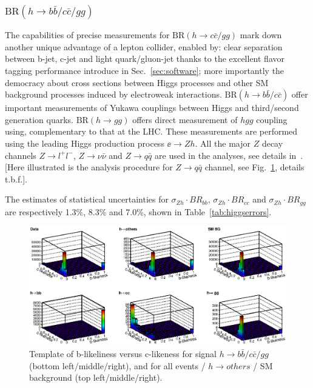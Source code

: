 \subsubsection{$\mathrm{BR}(h\to b\bar{b}/c\bar{c}/gg)$}
The capabilities of precise measurements for $\mathrm{BR}(h\to c\bar{c}/gg)$ 
mark down another unique advantage of a lepton collider, enabled by:
clear separation between b-jet, c-jet and light quark/gluon-jet thanks to the
excellent flavor tagging performance introduce in Sec.~\ref{sec:software};
more importantly the democracy about cross sections between Higgs processes and
other SM background processes induced by electroweak interactions.
$\mathrm{BR}(h\to b\bar{b}/c\bar{c})$ offer important measurements of 
Yukawa couplings between Higgs and third/second generation quarks. 
$\mathrm{BR}(h\to gg)$ offers direct measurement of $hgg$ coupling 
using, complementary to that at the LHC. These measurements are performed
using the leading Higgs production process $\ee\to Zh$. All the major $Z$ decay
channels $Z\to l^+l^-$, $Z\to\nu\bar{\nu}$ and $Z\to q\bar{q}$ are used in the analyses,
see details in~\cite{Ono:2013sea}. [Here illustrated is the analysis procedure 
for $Z\to q\bar{q}$ channel, see Fig.~\ref{fig:qqHbbccgg250}, details t.b.f.].

The estimates of statistical uncertainties for $\sigma_{Zh}\cdot BR_{bb}$,
$\sigma_{Zh}\cdot BR_{cc}$ and $\sigma_{Zh}\cdot BR_{gg}$ are respectively
1.3\%, 8.3\% and 7.0\%, shown in Table~\ref{tab:higgserrors}.

\begin{figure}
\begin{center}
\includegraphics[width=0.85\hsize]{chapters/figures/qqh_bbccgg_template_250.eps}
\end{center}
  \caption{Template of b-likeliness versus c-likeness for signal $h\to b\bar{b}/c\bar{c}/gg$
  (bottom left/middle/right),
and for all events / $h\to others$ / SM background (top left/middle/right).}
  \label{fig:qqHbbccgg250}
\end{figure}

